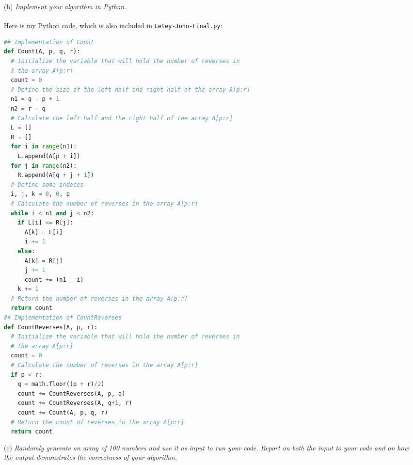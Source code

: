 \documentclass[12pt]{article}
\begin{document}
{\begin{enumerate}
\begin{lstlisting}
  for i = 1 to n1
    L[i] = A[p + i - 1]
  for j = 1 to n2
    R[j] = A[q + j]
  L[n1 + 1] = infinity
  R[n2 + 1] = infinity
  i = 1
  j = 1
  for k = p to r
    if L[i] <= R[j]
      A[k] = L[i]
      i = i + 1
    else 
      A[k] = R[j]
      j = j + 1
\end{lstlisting}
The pseudocode for the \texttt{Merge} procedure won't need a lot of changes. All I need to do is add a counter for it to return. I will also be getting rid of lines 8 and 9 of the pseudocode. All I need to modify in the \texttt{merge} and \texttt{Merge-Sort} algorithms is add counters. I added a counter to sum up all of the reverses in the current recursive call, and another counter in the "\texttt{merge}" function, in the else statement when $L[i]>R[j]$, which is exactly what we want.
\item[(b)]\textsl{Implement your algorithm in Python.}\\ \\
Here is my Python code, which is also included in \texttt{Letey-John-Final.py}:
\begin{lstlisting}[language=Python]
## Implementation of Count
def Count(A, p, q, r):
  # Initialize the variable that will hold the number of reverses in 
  # the array A[p:r]
  count = 0
  # Define the size of the left half and right half of the array A[p:r]
  n1 = q - p + 1
  n2 = r - q
  # Calculate the left half and the right half of the array A[p:r]
  L = []
  R = []
  for i in range(n1):
    L.append(A[p + i])
  for j in range(n2):
    R.append(A[q + j + 1])
  # Define some indeces
  i, j, k = 0, 0, p
  # Calculate the number of reverses in the array A[p:r]
  while i < n1 and j < n2:
    if L[i] <= R[j]:
      A[k] = L[i]
      i += 1
    else:
      A[k] = R[j]
      j += 1
      count += (n1 - i)
    k += 1
  # Return the number of reverses in the array A[p:r]
  return count
## Implementation of CountReverses
def CountReverses(A, p, r):
  # Initialize the variable that will hold the number of reverses in
  # the array A[p:r]
  count = 0
  # Calculate the number of reverses in the array A[p:r]
  if p < r:
    q = math.floor((p + r)/2)
    count += CountReverses(A, p, q)
    count += CountReverses(A, q+1, r)
    count += Count(A, p, q, r)
  # Return the count of reverses in the array A[p:r]
  return count
\end{lstlisting}
\item[(c)]\textsl{Randomly generate an array of 100 numbers and use it as input to run your code. Report on both the input to your code and on how the output demonstrates the correctness of your algorithm.}\\ \\

\end{enumerate}}
\end{document}
